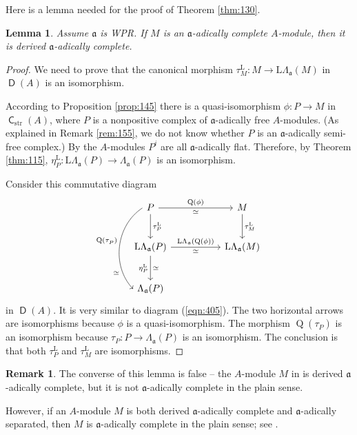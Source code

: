 \documentclass[10pt]{amsart}
\newtheorem{lem}[equation]{Lemma}
\theoremstyle{definition}
\newtheorem{rem}[equation]{Remark}
\numberwithin{equation}{section}
\newcommand{\opn}{\operatorname}
\newcommand{\cat}[1]{\operatorname{\mathsf{#1}}}
\newcommand{\mfrak}[1]{\mathfrak{#1}}
\newcommand{\mrm}[1]{\mathrm{#1}}
\newcommand{\La}{\Lambda}
\renewcommand{\a}{\mfrak{a}}
\begin{document}
Here is a lemma needed for the proof of Theorem \ref{thm:130}.

\begin{lem} \label{lem:146}
Assume $\a$ is WPR.
If $M$ is an $\a$-adically complete $A$-module, then it is derived
$\a$-adically complete.
\end{lem}

\begin{proof}
We need to prove that the canonical morphism
$\tau^{\mrm{L}}_{M} :M \to \mrm{L} \La_{\a}(M)$
in $\cat{D}(A)$ is an isomorphism.

According to Proposition \ref{prop:145} there is a quasi-isomorphism
$\phi : P \to M$ in $\cat{C}_{\mrm{str}}(A)$, where $P$ is a nonpositive
complex of $\a$-adically free $A$-modules.
(As explained in Remark \ref{rem:155}, we do not know whether $P$ is an
$\a$-adically semi-free complex.)
By \cite[Theorem 5.3]{Ye4} the $A$-modules $P^i$ are all $\a$-adically
flat. Therefore, by Theorem \ref{thm:115},
$\eta^{\mrm{L}}_{P} : \mrm{L} \La_{\a}(P) \to \La_{\a}(P)$ is
an isomorphism.

Consider this commutative diagram
\begin{equation} \label{eqn:406}
\begin{tikzcd} [column sep = 12ex, row sep = 6ex]
P
\ar[d, "{\tau^{\mrm{L}}_P}"]
\ar[r, "{\opn{Q}(\phi)}", "{\simeq}"']
\arrow[dd, bend right = 50, start anchor = west, end anchor = west,
"{\opn{Q}(\tau^{}_P)}"', "{\simeq}"' near end]
&
M
\ar[d, "{\tau^{\mrm{L}}_M}"]
\\
\mrm{L} \La_{\a}(P)
\ar[r, "{\mrm{L} \La_{\a}(\opn{Q}(\phi))}", "{\simeq}"']
\ar[d, "{\eta^{\mrm{L}}_{P}}"', "{\simeq}"]
&
\mrm{L} \La_{\a}(M)
\\
\La_{\a}(P)
&
\end{tikzcd}
\end{equation}
in $\cat{D}(A)$. It is very similar to diagram (\ref{eqn:405}).
The two horizontal arrows are isomorphisms because
$\phi$ is a quasi-isomorphism.
The morphism $\opn{Q}(\tau^{}_P)$ is an isomorphism because
$\tau^{}_P : P \to \La_{\a}(P)$ is an isomorphism.
The conclusion is that both $\tau^{\mrm{L}}_{P}$ and
$\tau^{\mrm{L}}_{M}$ are isomorphisms.
\end{proof}

\begin{rem} \label{rem:150}
The converse of this lemma is false -- the $A$-module $M$ in
\cite[Example 3.20]{Ye1} is derived $\a$-adically complete, but it is not
$\a$-adically complete in the plain sense.

However, if an $A$-module $M$ is both derived $\a$-adically complete
and $\a$-adically separated, then $M$ is $\a$-adically complete
in the plain sense; see \cite{Ye2}.
\end{rem}
\end{document}
